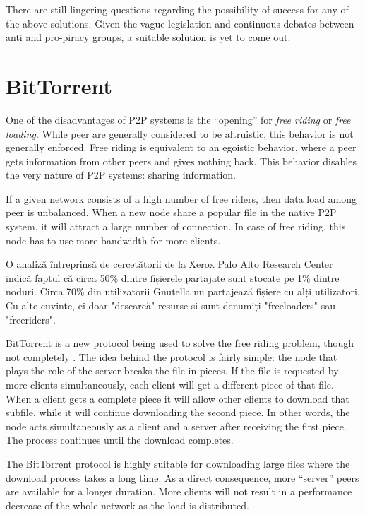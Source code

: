 There are still lingering questions regarding the possibility of success for
any of the above solutions. Given the vague legislation and continuous debates
between anti and pro-piracy groups, a suitable solution is yet to come out.

\section{BitTorrent}
\label{sec:p2p-systems:bittorrent}

One of the disadvantages of P2P systems is the ``opening'' for \textit{free
riding} \cite{free-riding} or \textit{free loading}. While peer are generally
considered to be altruistic, this behavior is not generally enforced. Free
riding is equivalent to an egoistic behavior, where a peer gets information
from other peers and gives nothing back. This behavior disables the very
nature of P2P systems: sharing information.

If a given network consists of a high number of free riders, then data load
among peer is unbalanced. When a new node share a popular file in the native
P2P system, it will attract a large number of connection. In case of free
riding, this node has to use more bandwidth for more clients.

O analiză întreprinsă de cercetătorii de la Xerox Palo Alto Research Center
indică faptul că circa 50\% dintre fișierele partajate sunt stocate pe 1\%
dintre noduri. Circa 70\% din utilizatorii Gnutella nu partajează fișiere cu
alți utilizatori. Cu alte cuvinte, ei doar "descarcă" resurse și sunt denumiți
"freeloaders" sau "freeriders".

BitTorrent is a new protocol being used to solve the free riding problem,
though not completely \cite{free-riding}. The idea behind the protocol is
fairly simple: the node that plays the role of the server breaks the file in
pieces. If the file is requested by more clients simultaneously, each client
will get a different piece of that file. When a client gets a complete piece
it will allow other clients to download that subfile, while it will continue
downloading the second piece. In other words, the node acts simultaneously as
a client and a server after receiving the first piece. The process continues
until the download completes.

The BitTorrent protocol is highly suitable for downloading large files where
the download process takes a long time. As a direct consequence, more
``server'' peers are available for a longer duration. More clients will not
result in a performance decrease of the whole network as the load is
distributed.


